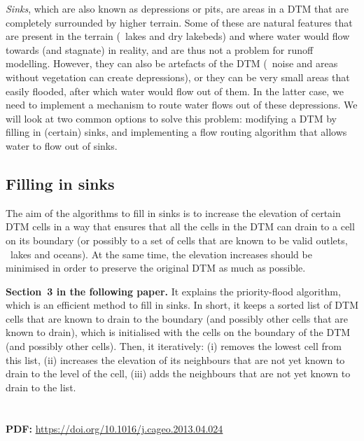 \emph{Sinks}, which are also known as depressions or pits, are areas in a DTM that are completely surrounded by higher terrain.
Some of these are natural features that are present in the terrain (\eg\ lakes and dry lakebeds) and where water would flow towards (and stagnate) in reality, and are thus not a problem for runoff modelling.
However, they can also be artefacts of the DTM (\eg\ noise and areas without vegetation can create depressions), or they can be very small areas that easily flooded, after which water would flow out of them.
In the latter case, we need to implement a mechanism to route water flows out of these depressions.
We will look at two common options to solve this problem: modifying a DTM by filling in (certain) sinks, and implementing a flow routing algorithm that allows water to flow out of sinks.

\subsection{Filling in sinks}

The aim of the algorithms to fill in sinks is to increase the elevation of certain DTM cells in a way that ensures that all the cells in the DTM can drain to a cell on its boundary (or possibly to a set of cells that are known to be valid outlets, \eg\ lakes and oceans)\@.
At the same time, the elevation increases should be minimised in order to preserve the original DTM as much as possible.

\begin{kaobox}[frametitle=\faExternalLink\ To read or to watch.]
\textbf{Section~3 in the following paper.} It explains the priority-flood algorithm, which is an efficient method to fill in sinks.
In short, it keeps a sorted list of DTM cells that are known to drain to the boundary (and possibly other cells that are known to drain), which is initialised with the cells on the boundary of the DTM (and possibly other cells)\@.
Then, it iteratively: (i) removes the lowest cell from this list, (ii) increases the elevation of its neighbours that are not yet known to drain to the level of the cell, (iii) adds the neighbours that are not yet known to drain to the list.
\\
\\
\\
\textbf{PDF:} \url{https://doi.org/10.1016/j.cageo.2013.04.024}
\end{kaobox}


